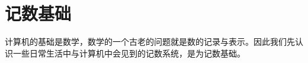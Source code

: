 \chapter{记数基础}\label{ch:NumberSystemBasics}
    计算机的基础是数学，数学的一个古老的问题就是数的记录与表示。因此我们先认识一些日常生活中与计算机中会见到的记数系统，是为记数基础。
